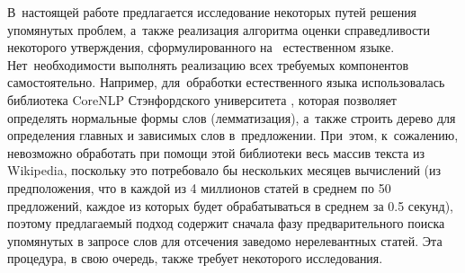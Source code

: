 В~настоящей работе предлагается исследование некоторых путей решения  упомянутых проблем, 
а~также реализация алгоритма оценки
 справедливости некоторого утверждения, сформулированного на~ естественном языке. 
Нет~необходимости выполнять реализацию всех
 требуемых компонентов самостоятельно. Например, для~обработки
 естественного языка использовалась библиотека CoreNLP Стэнфордского
 университета \cite{corenlp}, которая позволяет определять нормальные формы слов
 (лемматизация), а~также строить дерево для определения главных и
 зависимых слов в~предложении. 
При~этом, к~сожалению, невозможно
 обработать при помощи этой библиотеки весь массив текста из
 Wikipedia, поскольку это потребовало бы нескольких месяцев вычислений
 (из предположения, что в каждой из 4 миллионов статей в среднем по 50 предложений,
 каждое из которых будет обрабатываться в среднем за 0.5 секунд), 
поэтому предлагаемый подход содержит
 сначала фазу предварительного поиска упомянутых в запросе слов для
 отсечения заведомо нерелевантных статей. Эта процедура, в свою
 очередь, также требует некоторого исследования.
